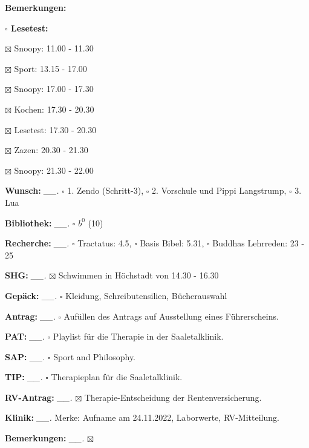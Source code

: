 \documentclass[10pt,a4paper]{article}
\newcommand\prop[1] {{\color {alizarin} {\bf #1}}}             %
\newcommand\opti[1] {{\color {amethyst} {\bf #1}}}             %
\newcommand\mand[1] {{\color {burntorange} {\bf #1}}}          %
\newcommand\bottomspace{\vskip 4pt}
\newcommand\n[1] { {\sl #1.} \hskip 5pt }
\begin{document}
\begin{mdframed}[style=daystyle]
\begin{labeling}{{\mand {Bemerkungen:}}}
\begin{minipage}{0.75\textwidth}
\begin{labeling}{\prop {$\square$ {Lesetest:}}}
      \item[$\boxtimes$ Snoopy:]   11.00 - 11.30
      \item[$\boxtimes$ Sport:]    13.15 - 17.00        
        
      \item[$\boxtimes$ Snoopy:]   17.00 - 17.30
      \item[$\boxtimes$ Kochen:]   17.30 - 20.30
      \item[$\boxtimes$ Lesetest:] 17.30 - 20.30
        
      \item[$\boxtimes$ Zazen:]    20.30 - 21.30
      \item[$\boxtimes$ Snoopy:]   21.30 - 22.00
      \end{labeling}
    \end{minipage}
    \bottomspace
  \item[{\mand {Wunsch:}}]       \n{\_\_} $\square$ 1. Zendo (Schritt-3),
      $\square$ 2. Vorschule und Pippi Langstrump, $\square$ 3. Lua
  \item[{\mand {Bibliothek:}}]   \n{\_\_} $\square$ $b^{0}$ (10)
  \item[{\mand {Recherche:}}]    \n{\_\_} $\square$ Tractatus: 4.5, $\square$ Basis Bibel: 5.31,
      $\square$ Buddhas Lehrreden: 23 - 25
  \item[{\mand {SHG:}}]          \n{\_\_} $\boxtimes$ Schwimmen in Höchstadt von 14.30 - 16.30
  \item[{\mand {Gepäck:}}]       \n{\_\_} $\square$ Kleidung, Schreibutensilien, Bücherauswahl
  \item[{\opti {Antrag:}}]       \n{\_\_} $\square$ Aufüllen des Antrags auf Ausstellung eines Führerscheins.
  \item[{\opti {PAT:}}]          \n{\_\_} $\square$ Playlist für die Therapie in der Saaletalklinik.
  \item[{\opti {SAP:}}]          \n{\_\_} $\square$ Sport and Philosophy.
  \item[{\opti {TIP:}}]          \n{\_\_} $\square$ Therapieplan für die Saaletalklinik.
  \item[{\opti {RV-Antrag:}}]    \n{\_\_} $\boxtimes$ Therapie-Entscheidung der Rentenversicherung.
  \item[{\opti {Klinik:}}]       \n{\_\_} Merke: Aufname am 24.11.2022, Laborwerte, RV-Mitteilung.
  \item[{\mand {Bemerkungen:}}]  \n{\_\_} $\boxtimes$
  \end{labeling}
    

\end{mdframed}
\end{document}
